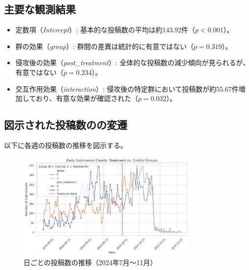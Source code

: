 \documentclass[11pt, a4j]{jreport}
\begin{document}
    \begin{table}[H]
        \centering
        \caption{投稿数の変化に関するOLS回帰結果}
        \label{tab:ols_results}
    \end{table}

    \subsection*{主要な観測結果}
    \begin{itemize}
        \item 定数項（\textit{Intercept}）: 基本的な投稿数の平均は約143.92件（$p < 0.001$）。
        \item 群の効果（\textit{group}）: 群間の差異は統計的に有意ではない（$p = 0.319$）。
        \item 侵攻後の効果（\textit{post\_treatment}）: 全体的な投稿数の減少傾向が見られるが、有意ではない（$p = 0.234$）。
        \item 交互作用効果（\textit{interaction}）: 侵攻後の特定群において投稿数が約55.67件増加しており、有意な効果が確認された（$p = 0.032$）。
    \end{itemize}

    \subsection*{図示された投稿数のの変遷}
    以下に各週の投稿数の推移を図示する。
    \begin{figure}[H]
        \centering
        \includegraphics[width=0.8\textwidth]{submission_count_plot.png}
        \caption{日ごとの投稿数の推移（2024年7月～11月）}
        \label{fig:submissions_comments_trends}
    \end{figure}
\end{document}
